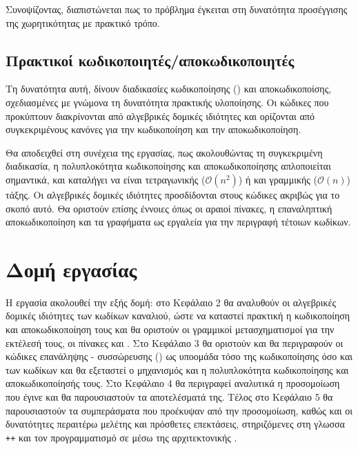 Συνοψίζοντας, διαπιστώνεται πως το πρόβλημα έγκειται στη δυνατότητα προσέγγισης της χωρητικότητας με πρακτικό τρόπο.

\subsection{Πρακτικοί κωδικοποιητές/αποκωδικοποιητές}
Τη δυνατότητα αυτή, δίνουν διαδικασίες κωδικοποίησης () και αποκωδικοποίσης, σχεδιασμένες με γνώμονα τη δυνατότητα πρακτικής υλοποίησης. Οι κώδικες που προκύπτουν διακρίνονται από αλγεβρικές δομικές ιδιότητες και ορίζονται από συγκεκριμένους κανόνες για την κωδικοποίηση και την αποκωδικοποίηση.

Θα αποδειχθεί στη συνέχεια της εργασίας, πως ακολουθώντας τη συγκεκριμένη διαδικασία, η πολυπλοκότητα κωδικοποίησης και αποκωδικοποίησης απλοποιείται σημαντικά, και καταλήγει να είναι τετραγωνικής ($\mathcal{O}(n^2)$) ή και γραμμικής ($\mathcal{O}(n)$) τάξης. Οι αλγεβρικές δομικές ιδιότητες προσδίδονται στους κώδικες ακριβώς για το σκοπό αυτό. Θα οριστούν επίσης έννοιες όπως οι αραιοί πίνακες, η επαναληπτική αποκωδικοποίηση και τα γραφήματα  ως εργαλεία για την περιγραφή τέτοιων κωδίκων.

\section{Δομή εργασίας}
Η εργασία ακολουθεί την εξής δομή: στο Κεφάλαιο 2 θα αναλυθούν οι αλγεβρικές δομικές ιδιότητες των κωδίκων καναλιού, ώστε να καταστεί πρακτική η κωδικοποίηση και αποκωδικοποίηση τους και θα οριστούν οι γραμμικοί μετασχηματισμοί για την εκτέλεσή τους, οι πίνακες \textbf{} και \textbf{}. Στο Κεφάλαιο 3 θα οριστούν και θα περιγραφούν οι κώδικες επανάληψης - συσσώρευσης () ως υποομάδα τόσο της κωδικοποίησης  όσο και των  κωδίκων και θα εξεταστεί ο μηχανισμός και η πολυπλοκότητα κωδικοποίησης και αποκωδικοποίησής τους. Στο Κεφάλαιο 4 θα περιγραφεί αναλυτικά η προσομοίωση που έγινε και θα παρουσιαστούν τα αποτελέσματά της. Τέλος στο Κεφάλαιο 5 θα παρουσιαστούν τα συμπεράσματα που προέκυψαν από την προσομοίωση, καθώς και οι δυνατότητες περαιτέρω μελέτης και πρόσθετες επεκτάσεις, στηριζόμενες στη γλωσσα \texttt{++} και τον προγραμματισμό σε  μέσω της αρχιτεκτονικής .